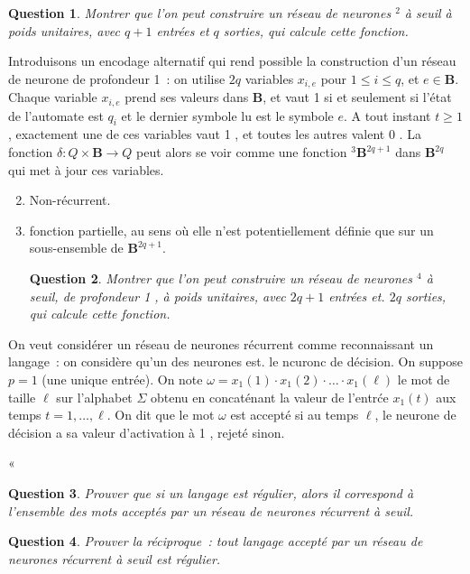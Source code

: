 \documentclass[10pt]{article}
\newtheorem{question}{Question}
\begin{document}
\begin{question}
	Montrer que l'on peut construire un réseau de neurones ${ }^{2}$ à seuil à poids unitaires, avec $q+1$ entrées et $q$ sorties, qui calcule cette fonction.
\end{question}

Introduisons un encodage alternatif qui rend possible la construction d'un réseau de neurone de profondeur 1 : on utilise $2 q$ variables $x_{i, e}$ pour $1 ≤ i ≤ q$, et $e \in \mathbf{B}$. Chaque variable $x_{i, e}$ prend ses valeurs dans $\mathbf{B}$, et vaut 1 si et seulement si l'état de l'automate est $q_{i}$ et le dernier symbole lu est le symbole $e$. A tout instant $t ≥ 1$, exactement une de ces variables vaut 1 , et toutes les autres valent 0 . La fonction $δ: Q \times \mathbf{B} → Q$ peut alors se voir comme une fonction ${ }^{3} \mathbf{B}^{2 q+1}$ dans $\mathbf{B}^{2 q}$ qui met à jour ces variables.

\begin{enumerate}
  \setcounter{enumi}{1}
  \item Non-récurrent.

  \item fonction partielle, au sens où elle n'est potentiellement définie que sur un sous-ensemble de $\mathbf{B}^{2 q+1}$. \begin{question}
	Montrer que l'on peut construire un réseau de neurones ${ }^{4}$ à seuil, de profondeur 1 , à poids unitaires, avec $2 q+1$ entrées et. $2 q$ sorties, qui calcule cette fonction.
\end{question}

\end{enumerate}

On veut considérer un réseau de neurones récurrent comme reconnaissant un langage : on considère qu'un des neurones est. le ncuronc de décision. On suppose $p=1$ (une unique entrée). On note $\omega=x_{1}(1) \cdot x_{1}(2) \cdot \ldots \cdot x_{1}(\ell)$ le mot de taille $\ell$ sur l'alphabet $Σ$ obtenu en concaténant la valeur de l'entrće $x_{1}(t)$ aux temps $t=1, \ldots, \ell$. On dit que le mot $\omega$ est accepté si au temps $\ell$, le neurone de décision a sa valeur d'activation à 1 , rejeté sinon.

« \begin{question}
	Prouver que si un langage est régulier, alors il correspond à l'ensemble des mots acceptés par un réseau de neurones récurrent à seuil.
\end{question}

\begin{question}
	Prouver la réciproque : tout langage accepté par un réseau de neurones récurrent à seuil est régulier.
\end{question}
\end{document}
